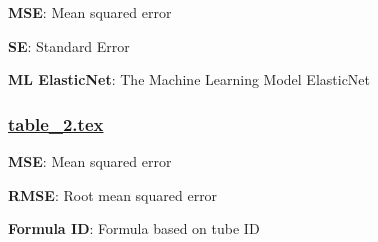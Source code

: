 \documentclass[11pt]{article}
\begin{document}
\begin{codeoutput}
\begin{table}[h]
\caption{Machine learning models performance comparison.}
\label{table:ML\_Model\_Performance}
\begin{threeparttable}
\renewcommand{\TPTminimum}{\linewidth}
\begin{tablenotes}
\footnotesize
\item \textbf{MSE}: Mean squared error
\item \textbf{SE}: Standard Error
\item \textbf{ML ElasticNet}: The Machine Learning Model ElasticNet
\end{tablenotes}
\end{threeparttable}
\end{table}
\end{codeoutput}

\subsubsection*{\hyperlink{code-LaTeX Table Design-table-2-tex}{table\_2.tex}}

\begin{codeoutput}
\begin{table}[h]
\caption{Formula based models performance comparison.}
\label{table:Formula\_Model\_Performance}
\begin{threeparttable}
\renewcommand{\TPTminimum}{\linewidth}
\begin{tablenotes}
\footnotesize
\item \textbf{MSE}: Mean squared error
\item \textbf{RMSE}: Root mean squared error
\item \textbf{Formula ID}: Formula based on tube ID
\end{tablenotes}
\end{threeparttable}
\end{table}
\end{codeoutput}
\end{document}
